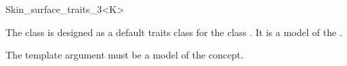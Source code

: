
\begin{ccRefClass}{Skin_surface_traits_3<K>}
  \ccDefinition 

  The class \ccRefName is designed as a default traits class for the
  class . It is a model of
  the .
  
  The template argument  must be a model of the 
  concept.

    




  \ccIsModel 
%

\end{ccRefClass}


